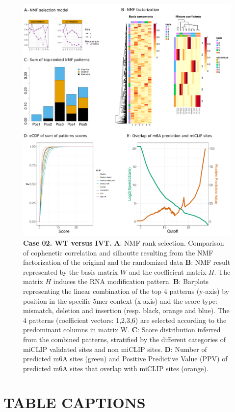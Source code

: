 \documentclass[times, 11pt, a4paper]{article}
\begin{document}
\newpage
\begin{figure}[h!]
	\includegraphics[width = 1\textwidth]{img/res_wt_ivt.pdf}
	\caption{\textbf{Case 02. WT  versus IVT.}  \textbf{A}: NMF rank selection. Comparison of cophenetic correlation and silhoutte resulting from the NMF factorization of the original and the randomized data \textbf{B}: NMF result represented by the basis matrix $W$ and the coefficient matrix $H$. The matrix $H$ induces the RNA modification pattern. \textbf{B}: Barplots representing the linear combination of the top 4 patterns (y-axis) by position in the specific 5mer context (x-axis) and the score type: mismatch, deletion and insertion (resp. black, orange and blue). The 4 patterns (coefficient vectors: 1,2,3,6) are selected according to the predominant columns in matrix W.  \textbf{C}: Score distribution inferred from the combined patterns, stratified by the different categories of miCLIP validated sites and non miCLIP sites.  \textbf{D}: Number of predicted m6A sites (green) and Positive Predictive Value (PPV) of predicted m6A sites that overlap with miCLIP sites (orange). }
	\label{fig:WT_IVT}
\end{figure}
\newpage
\section*{TABLE CAPTIONS}
\end{document}
